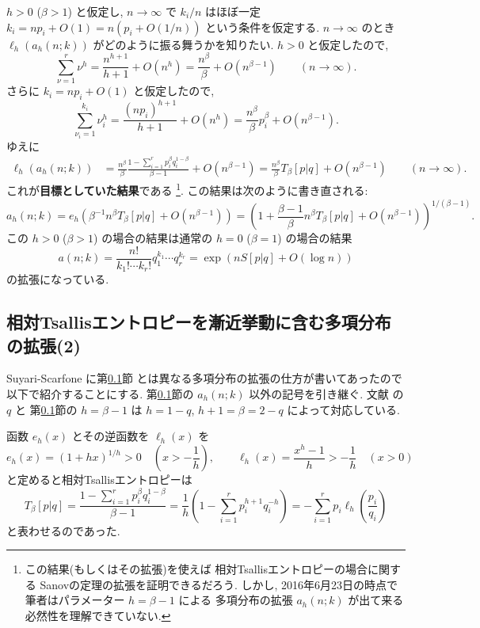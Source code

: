 \documentclass[12pt,twoside]{jarticle}
\theoremstyle{definition} %
\theoremstyle{definition} %
\theoremstyle{definition} %
\numberwithin{theorem}{section}
\numberwithin{equation}{section}
\numberwithin{figure}{section}
\numberwithin{table}{section}
\newcommand\secref[1]{第\ref{#1}節}
\begin{document}
$h>0$ ($\beta>1$) と仮定し, 
$n\to\infty$ で $k_i/n$ はほぼ一定 $k_i=n p_i + O(1)=n(p_i+O(1/n))$ という条件を仮定する.
$n\to\infty$ のとき $\ell_h(a_h(n;k))$ がどのように振る舞うかを知りたい.
$h>0$ と仮定したので, 
\[
\sum_{\nu=1}^r \nu^h 
= \frac{n^{h+1}}{h+1} + O(n^h)
= \frac{n^\beta}{\beta} + O(n^{\beta-1})
\qquad (n\to\infty).
\]
さらに $k_i=np_i+O(1)$ と仮定したので, 
\[
\sum_{\nu_i=1}^{k_i}\nu_i^h 
= \frac{(np_i)^{h+1}}{h+1} + O(n^h)
= \frac{n^\beta}{\beta}p_i^\beta+ O(n^{\beta-1}).
\]
ゆえに
\begin{align*}
\ell_h(a_h(n;k))
&
=\frac{n^\beta}{\beta}\frac{1-\sum_{i=1}^r p_i^\beta q_i^{1-\beta}}{\beta-1}
+ O(n^{\beta-1})
=\frac{n^\beta}{\beta} T_\beta[p|q] + O(n^{\beta-1})
\qquad(n\to\infty).
\end{align*}
これが{\bf 目標としていた結果}である%
\footnote{この結果(もしくはその拡張)を使えば
相対Tsallisエントロピーの場合に関する
Sanovの定理の拡張を証明できるだろう.
しかし, 2016年6月23日の時点で筆者はパラメーター $h=\beta-1$ による
多項分布の拡張 $a_h(n;k)$ が出て来る必然性を理解できていない.}. 
この結果は次のように書き直される:
\[
a_h(n;k)
=e_h\left( \beta^{-1}n^\beta T_\beta[p|q] + O(n^{\beta-1}) \right)
=\left(1+\frac{\beta-1}{\beta}n^\beta T_\beta[p|q] + O(n^{\beta-1})\right)^{1/(\beta-1)}.
\]
この $h>0$ ($\beta>1$) の場合の結果は通常の $h=0$ ($\beta=1$) の場合の結果
\[
a(n;k)=\frac{n!}{k_1!\cdots k_r!}q_1^{k_1}\cdots q_r^{k_r}
=\exp\left(n S[p|q] + O(\log n) \right)
\]
の拡張になっている.



\subsection{相対Tsallisエントロピーを漸近挙動に含む多項分布の拡張(2)}
\label{sec:Tsallis-multinomial-2}

Suyari-Scarfone \cite{Sutari-Scarfone} に\secref{sec:Tsallis-multinomial-2}
とは異なる多項分布の拡張の仕方が書いてあったので以下で紹介することにする.
\secref{sec:Tsallis-multinomial-2}の $a_h(n;k)$ 以外の記号を引き継ぐ. 
文献 \cite{Sutari-Scarfone} の $q$ と
\secref{sec:Tsallis-multinomial-2}の $h=\beta-1$ は $h=1-q$, $h+1=\beta=2-q$
によって対応している.

函数 $e_h(x)$ とその逆函数を $\ell_h(x)$ を
\[
e_h(x)=(1+hx)^{1/h}>0 \quad \left(x>-\frac{1}{h}\right), \qquad 
\ell_h(x)=\frac{x^h-1}{h}>-\frac{1}{h} \quad (x>0)
\]
と定めると相対Tsallisエントロピーは
\[
T_\beta[p|q]
= \frac{1-\sum_{i=1}^r p_i^\beta q_i^{1-\beta}}{\beta-1}
= \frac{1}{h}\left(1-\sum_{i=1}^r p_i^{h+1}q_i^{-h}\right) 
= - \sum_{i=1}^r p_i\ell_h\left(\frac{p_i}{q_i}\right)
\]
と表わせるのであった.
\end{document}

